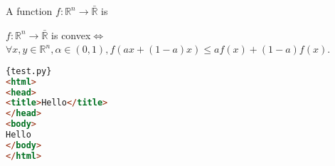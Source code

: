 \documentclass[11pt,fleqn]{book}
\def\R{\mathbb{R}}
\newcommand{\cvx}{convex}
\begin{document}
\begin{definition}[III]
A function $f : \R^n \to \bar{\R}$ is %
\end{definition}


\begin{theorem}
$f : \R^n \to \bar{\R}$ is \cvx  $\iff$ $\forall x,y \in \R^n, \alpha \in (0,1), f(ax + (1-a)x) \le af(x) + (1-a)f(x)$.
\end{theorem}

\begin{lstlisting}[language=html]{test.py}
<html>
<head>
<title>Hello</title>
</head>
<body>
Hello
</body>
</html>
\end{lstlisting}
\end{document}
